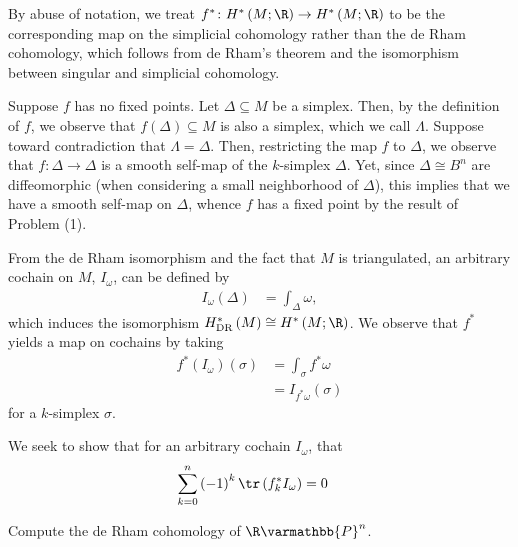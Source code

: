 \documentclass[10pt]{mypackage}
\renewcommand*{\mathbb}[1]{\varmathbb{#1}}
\begin{document}
\begin{solution}
  By abuse of notation, we treat $f^{\ast}\colon H^{\ast}\left( M;\R \right)\rightarrow H^{\ast}\left( M;\R \right)$ to be the corresponding map on the simplicial cohomology rather than the de Rham cohomology, which follows from de Rham's theorem and the isomorphism between singular and simplicial cohomology.\newline

  Suppose $f$ has no fixed points. Let $\Delta\subseteq M$ be a simplex. Then, by the definition of $f$, we observe that $f\left( \Delta \right)\subseteq M$ is also a simplex, which we call $\Lambda$. Suppose toward contradiction that $\Lambda = \Delta$. Then, restricting the map $f$ to $\Delta$, we observe that $f\colon \Delta \rightarrow \Delta$ is a smooth self-map of the $k$-simplex $\Delta$. Yet, since $\Delta\cong B^n$ are diffeomorphic (when considering a small neighborhood of $\Delta$), this implies that we have a smooth self-map on $\Delta$, whence $f$ has a fixed point by the result of Problem (1).\newline

  From the de Rham isomorphism and the fact that $M$ is triangulated, an arbitrary cochain on $M$, $I_{\omega}$, can be defined by
  \begin{align*}
    I_{\omega}\left( \Delta \right) &= \int_{\Delta}^{} \omega,
  \end{align*}
  which induces the isomorphism $H^{\ast}_{\operatorname{DR}}\left( M \right)\cong H^{\ast}\left( M;\R \right)$. We observe that $f^{\ast}$ yields a map on cochains by taking
  \begin{align*}
    f^{\ast}\left( I_{\omega} \right)\left( \sigma \right) &= \int_{\sigma}^{} f^{\ast}\omega\\
                                                           &= I_{f^{\ast}\omega}\left( \sigma \right)
  \end{align*}
  for a $k$-simplex $\sigma$.\newline

  We seek to show that for an arbitrary cochain $I_{\omega}$, that
  \begin{align*}
    \sum_{k=0}^{n} \left( -1 \right)^{k} \tr\left( f_k^{\ast}I_{\omega} \right) &= 0
  \end{align*}
\end{solution}
\begin{problem}[Problem 3]
  Compute the de Rham cohomology of $\R\mathbb{P}^{n}$.
\end{problem}
\end{document}
